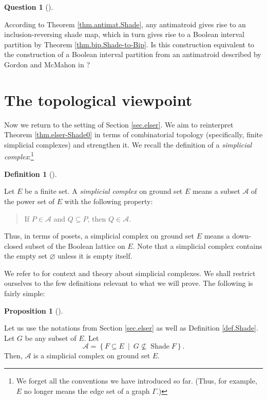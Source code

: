 \documentclass[numbers=enddot,12pt,final,onecolumn]{scrartcl}%
\theoremstyle{definition}
\newtheorem{prop}[theo]{Proposition}
\newenvironment{proposition}[1][]
{\begin{prop}[#1]\begin{leftbar}}
{\end{leftbar}\end{prop}}
\newtheorem{defi}[theo]{Definition}
\newenvironment{definition}[1][]
{\begin{defi}[#1]\begin{leftbar}}
{\end{leftbar}\end{defi}}
\newtheorem{quest}[theo]{Question}
\newenvironment{question}[1][]
{\begin{quest}[#1]\begin{leftbar}}
{\end{leftbar}\end{quest}}
\newenvironment{statement}{\begin{quote}}{\end{quote}}
\newenvironment{question}[1][Question]{\noindent\textbf{#1.} }{\ \rule{0.5em}{0.5em}}
\begin{document}
\begin{question}
According to Theorem \ref{thm.antimat.Shade}, any antimatroid gives rise to an
inclusion-reversing shade map, which in turn gives rise to a Boolean interval
partition by Theorem \ref{thm.bip.Shade-to-Bip}. Is this construction
equivalent to the construction of a Boolean interval partition from an
antimatroid described by Gordon and McMahon in \cite[Theorem 2.5]{GorMah97}?
\end{question}


\section{The topological viewpoint}

Now we return to the setting of Section \ref{sec.elser}. We aim to reinterpret
Theorem \ref{thm.elser-Shade0} in terms of combinatorial topology
(specifically, finite simplicial complexes) and strengthen it. We recall the
definition of a \emph{simplicial complex}:\footnote{We forget all the
conventions we have introduced so far. (Thus, for example, $E$ no longer means
the edge set of a graph $\Gamma$.)}

\begin{definition}
Let $E$ be a finite set. A \emph{simplicial complex} on ground set $E$ means a
subset $\mathcal{A}$ of the power set of $E$ with the following property:

\begin{statement}
If $P\in\mathcal{A}$ and $Q\subseteq P$, then $Q\in\mathcal{A}$.
\end{statement}
\end{definition}

Thus, in terms of posets, a simplicial complex on ground set $E$ means a
down-closed subset of the Boolean lattice on $E$. Note that a simplicial
complex contains the empty set $\varnothing$ unless it is empty itself.

We refer to \cite{Kozlov20} for context and theory about simplicial complexes.
We shall restrict ourselves to the few definitions relevant to what we will
prove. The following is fairly simple:

\begin{proposition}
\label{prop.elser-sc}Let us use the notations from Section \ref{sec.elser} as
well as Definition \ref{def.Shade}. Let $G$ be any subset of $E$. Let%
\begin{equation}
\mathcal{A}=\left\{  F\subseteq E\ \mid\ G\not \subseteq \operatorname*{Shade}%
F\right\}  . \label{eq.prop.elser-sc.A=}%
\end{equation}
Then, $\mathcal{A}$ is a simplicial complex on ground set $E$.
\end{proposition}
\end{document}
